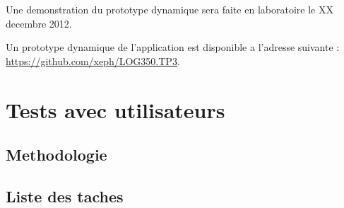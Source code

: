 \documentclass[letterpaper, oneside, 12pt, these, creativecommons]{thETS}
\begin{document}
Une demonstration du prototype dynamique sera faite en laboratoire le XX decembre 2012.

Un prototype dynamique de l'application est disponible a l'adresse suivante : 
\url{https://github.com/xeph/LOG350.TP3}.

\chapter{Tests avec utilisateurs}

\section{Methodologie}

\newpage

\section{Liste des taches}
\end{document}
